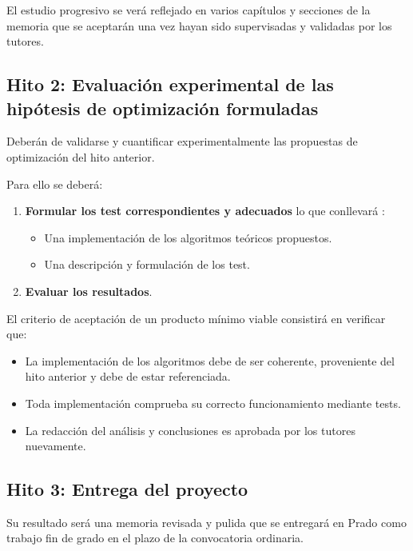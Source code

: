 El estudio progresivo se verá reflejado en varios capítulos y secciones de la memoria
que se aceptarán una vez hayan sido supervisadas y validadas por los tutores. 

\subsection*{Hito 2: Evaluación experimental de las hipótesis de optimización formuladas}

Deberán de validarse y cuantificar experimentalmente las propuestas de optimización del hito anterior. 

Para ello  se deberá: 
\begin{enumerate}
    \item \textbf{Formular los test correspondientes y adecuados} lo que conllevará : 
    \begin{itemize}
        \item Una implementación de los algoritmos teóricos propuestos.
        \item Una descripción y formulación de los test.
    \end{itemize}

    \item \textbf{Evaluar los resultados}. 
\end{enumerate}

El criterio de aceptación de un producto mínimo viable consistirá en verificar que:
\begin{itemize}
    \item La implementación de los algoritmos debe de ser coherente, proveniente del hito anterior y debe de estar referenciada.
    \item  Toda implementación comprueba su correcto funcionamiento mediante tests.
    \item La redacción del análisis y conclusiones es aprobada por los tutores nuevamente.
\end{itemize}




\subsection*{Hito 3: Entrega del proyecto}

Su resultado será una memoria revisada y pulida que se entregará en Prado como trabajo fin de grado en el plazo de la convocatoria ordinaria. 


